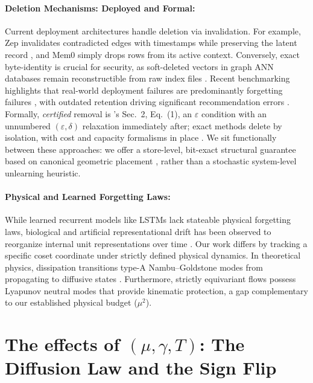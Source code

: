 \documentclass{article}
\begin{document}
\paragraph{Deletion Mechanisms: Deployed and Formal:}
Current deployment architectures handle deletion via invalidation. For example, Zep invalidates contradicted edges with timestamps while preserving the latent record \citep{rasmussen_zep_2025}, and Mem0 simply drops rows from its active context. Conversely, exact byte-identity is crucial for security, as soft-deleted vectors in graph ANN databases remain reconstructible from raw index files \citep{chakraborttii_ghost_2026}. Recent benchmarking highlights that real-world deployment failures are predominantly forgetting failures \citep{yang_control-plane_2026}, with outdated retention driving significant recommendation errors \citep{uddin_recall_2026}. Formally, \emph{certified} removal is \citeauthor{guo_certified_2023}'s \citeyearpar{guo_certified_2023} Sec.~2, Eq.~(1), an $\varepsilon$ condition with an unnumbered $(\varepsilon,\delta)$ relaxation immediately after; exact methods delete by isolation, with cost and capacity formalisms in place \citep{bourtoule_machine_2019,ginart_making_2019,sekhari_remember_2021}. We sit functionally between these approaches: we offer a store-level, bit-exact structural guarantee based on canonical geometric placement \citep{blelloch_strongly_2007}, rather than a stochastic system-level unlearning heuristic.

\paragraph{Physical and Learned Forgetting Laws:}
While learned recurrent models like LSTMs \citep{hochreiter_long_1997} lack stateable physical forgetting laws, biological and artificial representational drift has been observed to reorganize internal unit representations over time \citep{aitken_geometry_2022}. Our work differs by tracking a specific coset coordinate under strictly defined physical dynamics. In theoretical physics, dissipation transitions type-A Nambu--Goldstone modes from propagating to diffusive states \citep{minami_spontaneous_2018}. Furthermore, strictly equivariant flows possess Lyapunov neutral modes \citep{mo_symmetry-protected_2026} that provide kinematic protection, a gap complementary to our established physical budget ($\mu^2$).

\section{The effects of $(\mu,\gamma,T)$: The Diffusion Law and the Sign Flip}\label{app:budget}
\end{document}
